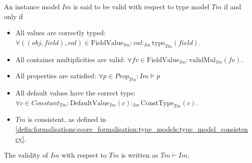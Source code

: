 \begin{defin}
\label{defin:formalisations:ecore_formalisation:instance_models:model_validity}
An instance model $Im$ is said to be valid with respect to type model $Tm$ if and only if
\begin{itemize}
    \item All values are correctly typed: $\forall ( ( obj, f\!ield ), val ) \in \mathrm{FieldValue}_{Im}\!: val:_{Im} \mathrm{type}_{Tm}(f\!ield)$.
    \item All container multiplicities are valid: $\forall fv \in \mathrm{FieldValue}_{Im}\!: \mathrm{validMul}_{Im}(f\!v)$.
    \item All properties are satisfied: $\forall p \in Prop_{Tm}\!: Im \models p$
    \item All default values have the correct type: $\forall c \in Constant_{Tm}\!: \mathrm{DefaultValue}_{Im}(c):_{Im} \mathrm{ConstType}_{Tm}(c)$.
    \item $Tm$ is consistent, as defined in \cref{defin:formalisations:ecore_formalisation:type_models:type_model_consistency}.
\end{itemize}

The validity of $Im$ with respect to $Tm$ is written as $Tm \vdash Im$.
\end{defin}